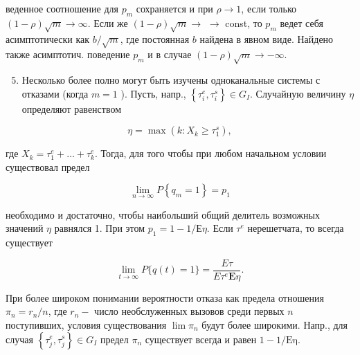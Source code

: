 \documentclass[10pt]{article}
\begin{document}
веденное соотношение для $p_{m}$ сохраняется и при $\rho \rightarrow 1$, если только $(1-\rho) \sqrt{m} \rightarrow \infty$. Если же $(1-\rho) \sqrt{m} \rightarrow$ $\rightarrow$ const, то $p_{m}$ ведет себя асимптотически как $b / \sqrt{m}$, где постоянная $b$ найдена в явном виде. Найдено также асимптотич. поведение $p_{m}$ и в случае $(1-\rho) \sqrt{m} \rightarrow-\infty$.



\begin{enumerate}

  \setcounter{enumi}{4}

  \item Несколько более полно могут быть изучены одноканальные системы с отказами (когда $m=1$ ). Пусть, напр., $\left\{\tau_{i}^{e}, \tau_{i}^{s}\right\} \in G_{I}$. Случайную величину $\eta$ определяют равенством

\end{enumerate}



\[

\eta=\max \left(k: X_{k} \geqslant \tau_{1}^{s}\right),

\]



где $X_{k}=\tau_{1}^{e}+\ldots+\tau_{k}^{e}$. Тогда, для того чтобы при любом начальном условии существовал предел



\[

\lim _{n \rightarrow \infty} P\left\{q_{m}=1\right\}=p_{1}

\]



необходимо и достаточно, чтобы наибольший общий делитель возможных значений $\eta$ равнялся 1. При этом $p_{1}=1-1 / Е \eta$. Если $\tau^{e}$ нерешетчата, то всегда существует



\[

\lim _{t \rightarrow \infty} P\{q(t)=1\}=\frac{E \tau}{E \tau^{e} \mathbf{E} \eta} .

\]



При более широком понимании вероятности отказа как предела отношения $\pi_{n}=r_{n} / n$, где $r_{n}-$ число необслуженных вызовов среди первых $n$ поступивших, условия существования $\lim \pi_{n}$ будут более широкими. Напр., для случая $\left\{\tau_{j}^{e}, \tau_{j}^{s}\right\} \in G_{I}$ предел $\pi_{n}$ существует всегда и равен $1-1 / \mathrm{E \eta}$.
\end{document}
